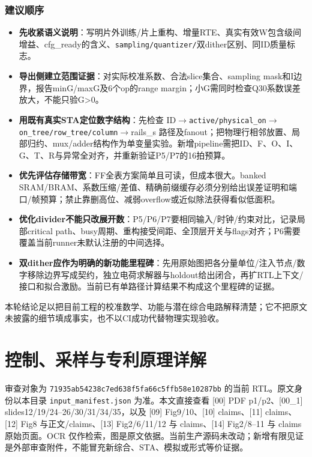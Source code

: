 \documentclass[UTF8,fontset=fandol,10pt,a4paper,openany]{ctexrep}
\newcommand{\code}[1]{\nolinkurl{#1}}
\begin{document}
\subsection{建议顺序}


\begin{itemize}
\item \textbf{先收紧语义说明}：写明片外训练/片上重构、增量RTE、真实有效W包含级间增益、cfg\_ready的含义、\code{sampling/quantizer/}双dither区别、同ID质量标志。
\item \textbf{导出侧建立范围证据}：对实际校准系数、合法slice集合、sampling mask和I边界，报告minG/maxG及6个op的range margin；小G需同时检查Q30系数误差放大，不能只验G>0。
\item \textbf{用既有真实STA定位数字结构}：先检查 ID\ensuremath{\rightarrow}\code{active/physical_on}\ensuremath{\rightarrow}\code{on_tree/row_tree/column}\ensuremath{\rightarrow}rails\_s 路径及fanout；把物理行相邻放置、局部归约、mux/adder结构作为单变量实验。新增pipeline需把ID、F、O、I、G、T、R与异常全对齐，并重新验证P5/P7的16拍预算。
\item \textbf{优先评估存储带宽}：FF全表方案简单且可读，但成本很大。banked SRAM/BRAM、系数压缩/差值、精确前缀缓存必须分别给出误差证明和端口/帧预算；禁止靠删高位、减弱overflow或近似除法获得看似低面积。
\item \textbf{优化divider不能只改展开数}：P5/P6/P7要相同输入/时钟/约束对比，记录局部critical path、busy周期、重构接受间距、全顶层开关与flags对齐；P6需要覆盖当前runner未默认注册的中间选择。
\item \textbf{双dither应作为明确的新功能里程碑}：先用原始图把各分量单位/注入节点/数字移除边界写成契约，独立电荷求解器与holdout给出闭合，再扩RTL上下文/接口和拟合激励。当前已有单路径计算结果不构成这个里程碑的证据。
\end{itemize}


本轮结论足以把目前工程的校准数学、功能与潜在综合电路解释清楚；它不把原文未披露的细节填成事实，也不以CI成功代替物理实现验收。
\chapter{控制、采样与专利原理详解}


审查对象为 \code{71935ab54238c7ed638f5fa66c5ffb58e10287bb} 的当前 RTL。原文身份以本目录 \code{input_manifest.json} 为准。本文直接查看 [00] PDF p1/p2、[00\_1] slides12/19/24–26/30/31/34/35，以及 [09] Fig9/10、[10] claims、[11] claims、[12] Fig8 与正文/claims、[13] Fig2/6/11/12 与 claims、[14] Fig2/8–11 与 claims 原始页面。OCR 仅作检索，图是原文依据。当前生产源码未改动；新增有限见证是外部审查附件，不能冒充新综合、STA、模拟或形式等价证据。
\end{document}
